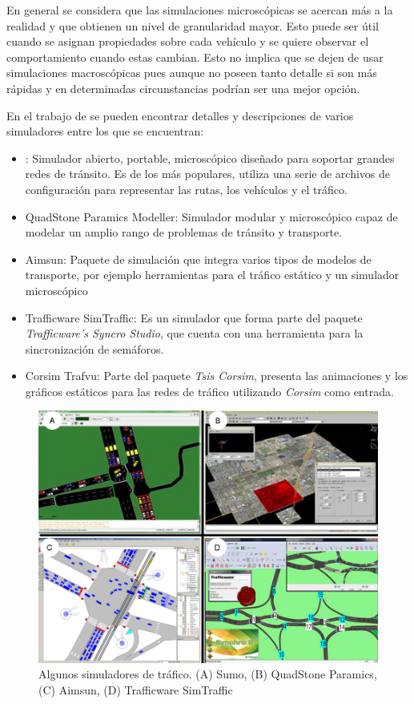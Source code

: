 En general se considera que las simulaciones microscópicas se acercan más a la realidad y que obtienen un nivel de granularidad mayor. Esto puede ser útil cuando se asignan propiedades sobre cada vehículo y se quiere observar el comportamiento cuando estas cambian. Esto no implica que se dejen de usar simulaciones macroscópicas pues aunque no poseen tanto detalle si son más rápidas y en determinadas circunstancias podrían ser una mejor opción.

En el trabajo de \citet{review_trafico} se pueden encontrar detalles y descripciones de varios simuladores entre los que se encuentran:
\begin{itemize}
	\item \citet{SUMO}: Simulador abierto, portable, microscópico diseñado para soportar grandes redes de tránsito. Es de los más populares, utiliza una serie de archivos de configuración para representar las rutas, los vehículos y el tráfico.
	\item QuadStone Paramics Modeller: Simulador modular y microscópico capaz de modelar un amplio rango de problemas de tránsito y transporte.
	\item Aimsun: Paquete de simulación que integra varios tipos de modelos de transporte, por ejemplo herramientas para el tráfico estático y un simulador microscópico
	\item Trafficware SimTraffic: Es un simulador que forma parte del paquete \emph{Trafficware's Syncro Studio}, que cuenta con una herramienta para la sincronización de semáforos.
	\item Corsim Trafvu: Parte del paquete \emph{Tsis Corsim}, presenta las animaciones y los gráficos estáticos para las redes de tráfico utilizando \emph{Corsim} como entrada.
\end{itemize}


\begin{figure}[H]
	\centering
	\includegraphics[width=0.9\linewidth]{Figures/simuladores}
	\caption[]{Algunos simuladores de tráfico. (A) Sumo, (B) QuadStone Paramics, (C) Aimsun, (D) Trafficware SimTraffic}
	\label{fig:simuladores}
\end{figure}

